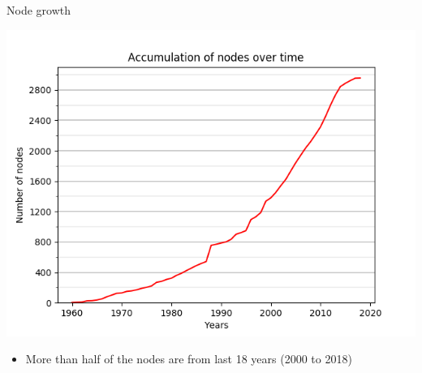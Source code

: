 \begin{frame}{Node growth}
\begin{center}
\includegraphics[scale=0.5]{graphics/nodesAccumulation.png} 
\end{center}
\begin{itemize}
\item More than half of the nodes are from last 18 years (2000 to 2018)
\end{itemize}
\end{frame}

